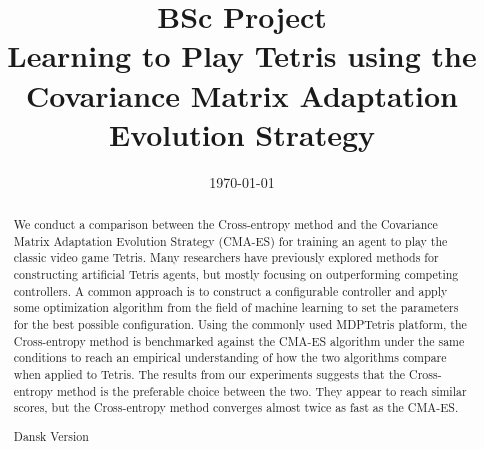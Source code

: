 







%
    

\title{BSc Project\\\textbf{Learning to Play Tetris using
    the Covariance Matrix Adaptation
    Evolution Strategy}}
\date{\today}

\thispagestyle{empty}
\tableofcontents
\thispagestyle{empty}

\clearpage

\thispagestyle{empty}
\begin{abstract}
We conduct a comparison between 
the Cross-entropy method and the Covariance Matrix Adaptation
Evolution Strategy (CMA-ES) for training 
an agent to play the classic video game Tetris. Many researchers have 
previously explored methods for constructing artificial Tetris
agents, but mostly focusing on outperforming competing controllers.
A common approach is to construct a configurable controller
and apply some optimization algorithm from the field of machine learning
to set the parameters for the best possible configuration. Using the 
commonly used MDPTetris \citep{mdptetris} platform, the Cross-entropy
method is benchmarked against the CMA-ES algorithm under the same
conditions to reach an empirical understanding of how the two algorithms
compare when applied to Tetris. The results from our experiments
suggests that the Cross-entropy method is the preferable choice
between the two. They appear to reach similar scores, 
but the Cross-entropy method converges almost twice as
fast as the CMA-ES.
\end{abstract}

\begin{abstract}
Dansk Version
\end{abstract}





\clearpage


\clearpage


\clearpage


\clearpage


\clearpage


\clearpage




\clearpage

\begin{appendices}



\end{appendices}


